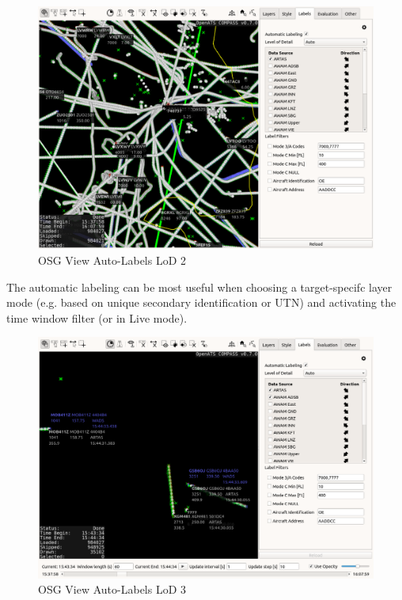 \begin{figure}[H]
    \hspace*{-2.5cm}
    \includegraphics[width=19cm,frame]{figures/osgview_label_lod2.png}
  \caption{OSG View Auto-Labels LoD 2}
\end{figure}

The automatic labeling can be most useful when choosing a target-specifc layer mode (e.g. based on unique secondary identification or UTN) and activating the time window filter (or in Live mode).

\begin{figure}[H]
    \hspace*{-2.5cm}
    \includegraphics[width=19cm,frame]{figures/osgview_label_lod3.png}
  \caption{OSG View Auto-Labels LoD 3}
\end{figure}


